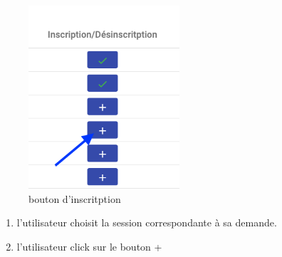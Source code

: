 \begin{figure}[!h]
	\includegraphics[width=0.5\textwidth,center]{Figures/us3-1}
	\caption{bouton d'inscritption}
\end{figure}

\begin{enumerate}
	\item l'utilisateur choisit la session correspondante à sa demande.
	\item l'utilisateur click sur le bouton +
\end{enumerate}